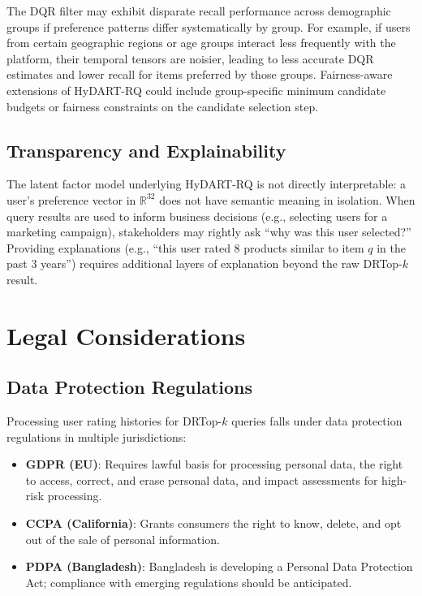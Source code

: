 The DQR filter may exhibit disparate recall performance across demographic groups if preference patterns differ systematically by group. For example, if users from certain geographic regions or age groups interact less frequently with the platform, their temporal tensors are noisier, leading to less accurate DQR estimates and lower recall for items preferred by those groups. Fairness-aware extensions of HyDART-RQ could include group-specific minimum candidate budgets or fairness constraints on the candidate selection step.

\subsection{Transparency and Explainability}

The latent factor model underlying HyDART-RQ is not directly interpretable: a user's preference vector in $\mathbb{R}^{32}$ does not have semantic meaning in isolation. When query results are used to inform business decisions (e.g., selecting users for a marketing campaign), stakeholders may rightly ask ``why was this user selected?'' Providing explanations (e.g., ``this user rated 8 products similar to item $q$ in the past 3 years'') requires additional layers of explanation beyond the raw DRTop-$k$ result.

\section{Legal Considerations}

\subsection{Data Protection Regulations}

Processing user rating histories for DRTop-$k$ queries falls under data protection regulations in multiple jurisdictions:
\begin{itemize}
  \item \textbf{GDPR (EU)}: Requires lawful basis for processing personal data, the right to access, correct, and erase personal data, and impact assessments for high-risk processing.
  \item \textbf{CCPA (California)}: Grants consumers the right to know, delete, and opt out of the sale of personal information.
  \item \textbf{PDPA (Bangladesh)}: Bangladesh is developing a Personal Data Protection Act; compliance with emerging regulations should be anticipated.
\end{itemize}

